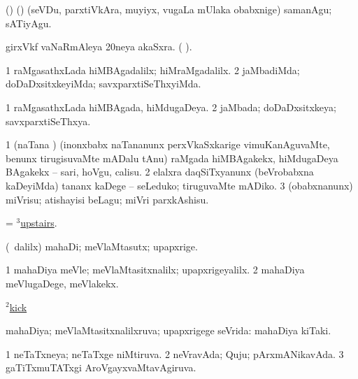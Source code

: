 \bentry
{} 
\gl{\kirxvi}
\expl{}
\bmng
(\birx) (\AmA) (seVDu, parxtiVkAra, muyiyx, \mo vugaLa mUlaka obabxnige) samanAgu; sATiyAgu. 
\emng
\eentry

\bentry
{} 
\gl{\nA}
\expl{}
\bmng
girxVkf vaNaRmAleya 20neya akaSxra. ( ). 
\emng
\eentry

\bentry
{} 
\gl{\kirxvi}
\expl{}
\bmng
\bnum
\num{1} raMgasathxLada hiMBAgadalilx; hiMraMgadalilx. 
\num{2} jaMbadiMda; doDaDxsitxkeyiMda; savxparxtiSeThxyiMda. 
\enum
\emng
\eentry

\bentry
{} 
\gl{\gu}
\expl{}
\bmng
\bnum
\num{1} raMgasathxLada hiMBAgada, hiMdugaDeya. 
\num{2} jaMbada; doDaDxsitxkeya; savxparxtiSeThxya. 
\enum
\emng
\eentry

\bentry
{} 
\gl{\sakirx}
\expl{}
\bmng
\bnum
\num{1} (naTana \vi) (inonxbabx naTananunx perxVkaSxkarige vimuKanAguvaMte, benunx tirugisuvaMte mADalu tAnu) raMgada hiMBAgakekx, hiMdugaDeya BAgakekx -- sari, hoVgu, calisu. 
\num{2} elalxra daqSiTxyanunx (beVrobabxna kaDeyiMda) tananx kaDege -- seLeduko; tiruguvaMte mADiko. 
\num{3} (obabxnanunx) miVrisu; atishayisi beLagu; miVri parxkAshisu. 
\enum
\emng
\eentry

\bentry
{} 
\gl{\gu}
\bmng
= \hyperlink{upstairs(3)}{$^3$upstairs}. 
\emng
\eentry

\bentry
{} 
\gl{\nA}
\expl{}
\bmng
(\sA\ \Eva dalilx) mahaDi; meVlaMtasutx; upapxrige. 
\emng
\eentry

\bentry
{} 
\gl{\kirxvi}
\expl{}
\bmng
\bnum
\num{1} mahaDiya meVle; meVlaMtasitxnalilx; upapxrigeyalilx. 
\num{2} mahaDiya meVlugaDege, meVlakekx. 
\enum
\emng

\noindent 
\gl{\pagu}
\expl{}
\bmng
\hyperref{kandict_k.pdf}{K}{kick(2) nuga(3)}{$^2$kick}  
\emng
\eentry

\bentry
{} 
\gl{\gu}
\expl{}
\bmng
mahaDiya; meVlaMtasitxnalilxruva; upapxrigege seVrida:  mahaDiya kiTaki. 
\emng
\eentry

\bentry
{} 
\gl{\gu}
\expl{}
\bmng
\bnum
\num{1} neTaTxneya; neTaTxge niMtiruva. 
\num{2} neVravAda; Quju; pArxmANikavAda. 
\num{3} gaTiTxmuTATxgi AroVgayxvaMtavAgiruva. 
\enum
\emng
\eentry

